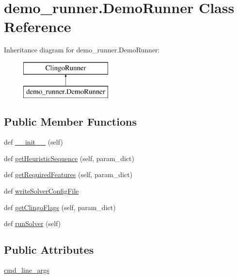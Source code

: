 \hypertarget{classdemo__runner_1_1_demo_runner}{}\section{demo\+\_\+runner.\+Demo\+Runner Class Reference}
\label{classdemo__runner_1_1_demo_runner}
Inheritance diagram for demo\+\_\+runner.\+Demo\+Runner\+:\begin{figure}[H]
\begin{center}
\leavevmode
\includegraphics[height=2.000000cm]{classdemo__runner_1_1_demo_runner}
\end{center}
\end{figure}
\subsection*{Public Member Functions}
\begin{DoxyCompactItemize}
\item 
def \hyperlink{classdemo__runner_1_1_demo_runner_a21c31f98bb46783faa2636722961a344}{\+\_\+\+\_\+init\+\_\+\+\_\+} (self)
\item 
def \hyperlink{classdemo__runner_1_1_demo_runner_a641d478a6b05a3ec3bc459a76bbc7b0f}{get\+Heuristic\+Sequence} (self, param\+\_\+dict)
\item 
def \hyperlink{classdemo__runner_1_1_demo_runner_aae5ac02e28d9930588823a8db7bfb686}{get\+Required\+Features} (self, param\+\_\+dict)
\item 
def \hyperlink{classdemo__runner_1_1_demo_runner_a87805525af36312ea4e778a618dfe0d3}{write\+Solver\+Config\+File}
\item 
def \hyperlink{classdemo__runner_1_1_demo_runner_a6b2f4e4c2bd2320e18b103ea631fe361}{get\+Clingo\+Flags} (self, param\+\_\+dict)
\item 
def \hyperlink{classdemo__runner_1_1_demo_runner_aa0ed83d1e5ff19c2168fc4dbf5236266}{run\+Solver} (self)
\end{DoxyCompactItemize}
\subsection*{Public Attributes}
\begin{DoxyCompactItemize}
\item 
\hyperlink{classdemo__runner_1_1_demo_runner_af8316834678869878cfe909526261c32}{cmd\+\_\+line\+\_\+args}
\end{DoxyCompactItemize}
